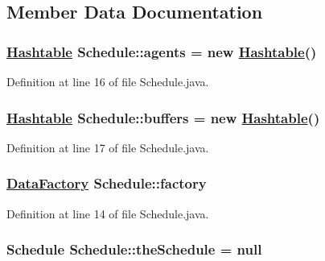 \subsection{Member Data Documentation}
\hypertarget{classSchedule_o2}{
\subsubsection[agents]{\setlength{\rightskip}{0pt plus 5cm}\hyperlink{classHashtable}{Hashtable} Schedule::agents = new \hyperlink{classHashtable}{Hashtable}()}}
\label{classSchedule_o2}




Definition at line 16 of file Schedule.java.\hypertarget{classSchedule_o3}{
\subsubsection[buffers]{\setlength{\rightskip}{0pt plus 5cm}\hyperlink{classHashtable}{Hashtable} Schedule::buffers = new \hyperlink{classHashtable}{Hashtable}()}}
\label{classSchedule_o3}




Definition at line 17 of file Schedule.java.\hypertarget{classSchedule_o0}{
\subsubsection[factory]{\setlength{\rightskip}{0pt plus 5cm}\hyperlink{interfaceDataFactory}{Data\-Factory} Schedule::factory}}
\label{classSchedule_o0}




Definition at line 14 of file Schedule.java.\hypertarget{classSchedule_r0}{
\subsubsection[theSchedule]{\setlength{\rightskip}{0pt plus 5cm}Schedule Schedule::the\-Schedule = null}}
\label{classSchedule_r0}




